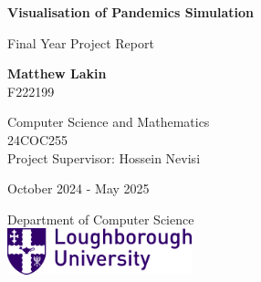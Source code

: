 \documentclass{report}
\begin{document}
\begin{titlepage}
    \begin{center}
        \vspace*{1cm}
            
        \Huge
        \textbf{Visualisation of Pandemics Simulation}
            
        \vspace{0.5cm}
        \LARGE
        Final Year Project Report
            
        \vspace{1.5cm}
            
        \textbf{Matthew Lakin}
        \\F222199
            
        \vfill
        
        Computer Science and Mathematics\\
        24COC255\\
        \vspace{0.5cm}
        Project Supervisor: Hossein Nevisi
            
        \Large
        October 2024 - May 2025\\

        \vspace{0.8cm}

        \LARGE
        Department of Computer Science\\
        \vspace{0.3cm}
        \includegraphics[width=0.4\textwidth]{Loughborough-University-Lboro-Logo.png}

        \vspace{2cm}
            
    \end{center}
\end{titlepage}

\newpage

\tableofcontents


\newpage
\end{document}
